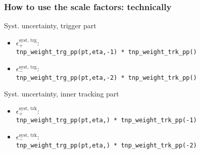 \documentclass[9pt]{beamer}
\begin{document}
 \begin{frame}[plain]
  \frametitle{How to use the scale factors: technically}
  
  \begin{block}{Syst. uncertainty, trigger part}
  \begin{itemize}
   \item \alert{$\epsilon^\text{syst, trg}_{+}$}: \\\texttt{tnp\_weight\_trg\_pp(pt,eta,\alert{-1}) * tnp\_weight\_trk\_pp()}
   
   \item \alert{$\epsilon^\text{syst, trg}_{-}$}: \\\texttt{tnp\_weight\_trg\_pp(pt,eta,\alert{-2}) * tnp\_weight\_trk\_pp()}
   \end{itemize}
  \end{block}
  
    \begin{block}{Syst. uncertainty, inner tracking part}
  \begin{itemize}
   \item \alert{$\epsilon^\text{syst, trk}_{+}$}: \\\texttt{tnp\_weight\_trg\_pp(pt,eta,) * tnp\_weight\_trk\_pp(\alert{-1})}
   
   \item \alert{$\epsilon^\text{syst, trk}_{-}$}: \\\texttt{tnp\_weight\_trg\_pp(pt,eta,) * tnp\_weight\_trk\_pp(\alert{-2})}
   \end{itemize}
  \end{block}
  

 \end{frame}
\end{document}
